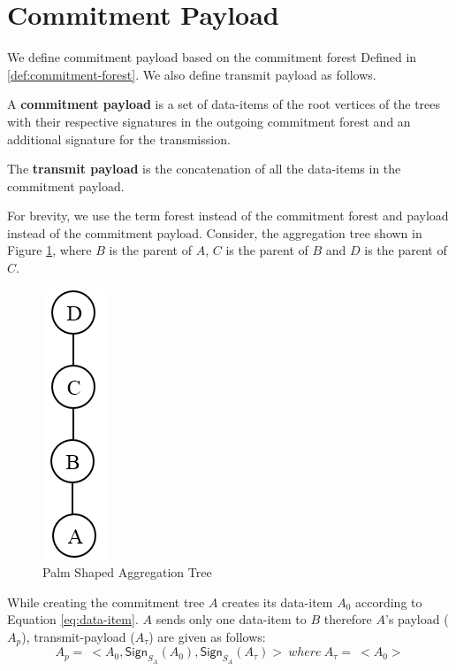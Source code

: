 \section{Commitment Payload}

	We define commitment payload based on the commitment forest Defined in \ref{def:commitment-forest}.
	We also define transmit payload as follows.
	\begin{definition}
		A \textbf{commitment payload} is a set of data-items of the root vertices of the trees with their respective signatures in the outgoing commitment forest and an additional signature for the transmission.
	\end{definition}
	\begin{definition}
		The \textbf{transmit payload} is the concatenation of all the data-items in the commitment payload.
	\end{definition}
	For brevity, we use the term forest instead of the commitment forest and payload instead of the commitment payload.
	Consider, the aggregation tree shown in Figure \ref{fig:Palm aggregation tree}, where $B$ is the parent of $A$, $C$ is the parent of $B$ and $D$ is the parent of $C$. 
	\begin{figure}[h!]
		\centering
		\includegraphics[scale = 1]{images/palm-aggregation-tree.png}
		\caption{Palm Shaped Aggregation Tree}
		\label{fig:Palm aggregation tree}
	\end{figure}
	While creating the commitment tree $A$ creates its data-item $A_{0}$ according to Equation \ref{eq:data-item}.
	$A$ sends only one data-item to $B$ therefore $A$'s payload ($A_{p}$), transmit-payload ($A_{\tau}$) are given as follows:
	\begin{equation}
		\label{eq:signing-payload}
			A_{p} =\ <A_{0}, \textsf{Sign}_{S_{A}}(A_{0}), \textsf{Sign}_{S_{A}}(A_{\tau}) >\ where\ A_{\tau} =\ < A_{0} > 
	\end{equation}
